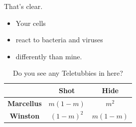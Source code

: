 \documentclass[a4paper, 11pt]{article}
\begin{document}
That's clear.

\begin{itemize}
 \item Your cells 
 \item react to bacteria and viruses 
 \item differently than mine.
\end{itemize}

\begin{table}
 \centering
 \begin{tabular}{|c|c|c|}
  \hline
  & \textbf{Shot} & \textbf{Hide}\\\hline
  \textbf{Marcellus} & $m(1 - m)$ & $m^2$\\
  \textbf{Winston} & $(1 - m)^2$ & $m(1 - m)$\\\hline
 \end{tabular}
 \caption{Do you see any Teletubbies in here?}
 \label{tab::tubbies}
\end{table}
\end{document}
